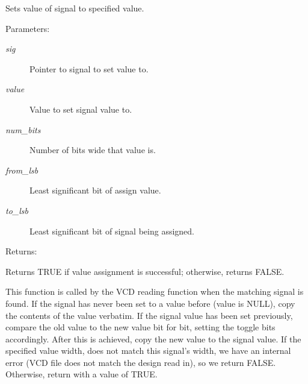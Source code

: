 Sets value of signal to specified value.

\begin{Desc}
\item[Parameters: ]\par
\begin{description}
\item[{\em 
sig}]Pointer to signal to set value to. \item[{\em 
value}]Value to set signal value to. \item[{\em 
num\_\-bits}]Number of bits wide that value is. \item[{\em 
from\_\-lsb}]Least significant bit of assign value. \item[{\em 
to\_\-lsb}]Least significant bit of signal being assigned. \end{description}
\end{Desc}
\begin{Desc}
\item[Returns: ]\par
Returns TRUE if value assignment is successful; otherwise, returns FALSE.\end{Desc}
This function is called by the VCD reading function when the matching signal is found. If the signal has never been set to a value before (value is NULL), copy the contents of the value verbatim. If the signal value has been set previously, compare the old value to the new value bit for bit, setting the toggle bits accordingly. After this is achieved, copy the new value to the signal value. If the specified value width, does not match this signal's width, we have an internal error (VCD file does not match the design read in), so we return FALSE. Otherwise, return with a value of TRUE. 